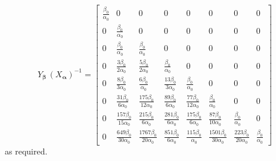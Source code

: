 \begin{displaymath}
{Y_{\boldsymbol{\beta}}\,\left(X_{\boldsymbol{\alpha}}\right)^{-1}} = \left[\begin{matrix}\frac{\beta_{0}}{\alpha_{0}} & 0 & 0 & 0 & 0 & 0 & 0 & 0\\0 & \frac{\beta_{0}}{\alpha_{0}} & 0 & 0 & 0 & 0 & 0 & 0\\0 & \frac{\beta_{0}}{\alpha_{0}} & \frac{\beta_{0}}{\alpha_{0}} & 0 & 0 & 0 & 0 & 0\\0 & \frac{3 \beta_{0}}{2 \alpha_{0}} & \frac{5 \beta_{0}}{2 \alpha_{0}} & \frac{\beta_{0}}{\alpha_{0}} & 0 & 0 & 0 & 0\\0 & \frac{8 \beta_{0}}{3 \alpha_{0}} & \frac{6 \beta_{0}}{\alpha_{0}} & \frac{13 \beta_{0}}{3 \alpha_{0}} & \frac{\beta_{0}}{\alpha_{0}} & 0 & 0 & 0\\0 & \frac{31 \beta_{0}}{6 \alpha_{0}} & \frac{175 \beta_{0}}{12 \alpha_{0}} & \frac{89 \beta_{0}}{6 \alpha_{0}} & \frac{77 \beta_{0}}{12 \alpha_{0}} & \frac{\beta_{0}}{\alpha_{0}} & 0 & 0\\0 & \frac{157 \beta_{0}}{15 \alpha_{0}} & \frac{215 \beta_{0}}{6 \alpha_{0}} & \frac{281 \beta_{0}}{6 \alpha_{0}} & \frac{175 \beta_{0}}{6 \alpha_{0}} & \frac{87 \beta_{0}}{10 \alpha_{0}} & \frac{\beta_{0}}{\alpha_{0}} & 0\\0 & \frac{649 \beta_{0}}{30 \alpha_{0}} & \frac{1767 \beta_{0}}{20 \alpha_{0}} & \frac{851 \beta_{0}}{6 \alpha_{0}} & \frac{115 \beta_{0}}{\alpha_{0}} & \frac{1501 \beta_{0}}{30 \alpha_{0}} & \frac{223 \beta_{0}}{20 \alpha_{0}} & \frac{\beta_{0}}{\alpha_{0}}\end{matrix}\right]
\end{displaymath}
as required.



